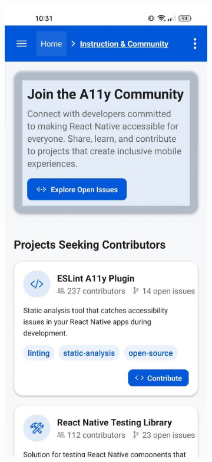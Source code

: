 \begin{figure}[ht]
    \centering
    \begin{subfigure}[b]{0.48\textwidth}
        \centering
        \includegraphics[width=\linewidth, alt={First part of the Instruction and community screen}]{img/instruction1.jpg}

\end{subfigure}
\end{figure}
